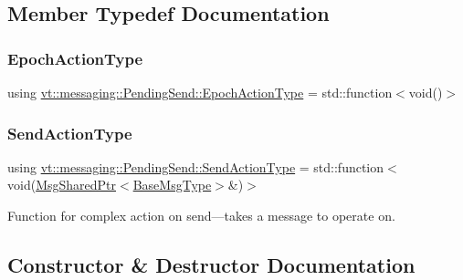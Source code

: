 \subsection{Member Typedef Documentation}
\mbox{\label{structvt_1_1messaging_1_1_pending_send_a25131dc5a5e003dc65187edc97c23d1c}} 
\subsubsection{\texorpdfstring{Epoch\+Action\+Type}{EpochActionType}}
{\footnotesize\ttfamily using \hyperlink{structvt_1_1messaging_1_1_pending_send_a25131dc5a5e003dc65187edc97c23d1c}{vt\+::messaging\+::\+Pending\+Send\+::\+Epoch\+Action\+Type} =  std\+::function$<$void()$>$}

\mbox{\label{structvt_1_1messaging_1_1_pending_send_aa13248a342d68230048cde8e0756851c}} 
\subsubsection{\texorpdfstring{Send\+Action\+Type}{SendActionType}}
{\footnotesize\ttfamily using \hyperlink{structvt_1_1messaging_1_1_pending_send_aa13248a342d68230048cde8e0756851c}{vt\+::messaging\+::\+Pending\+Send\+::\+Send\+Action\+Type} =  std\+::function$<$void(\hyperlink{structvt_1_1messaging_1_1_msg_shared_ptr}{Msg\+Shared\+Ptr}$<$\hyperlink{namespacevt_a44d0d4e144748f2b19a1cfd962f50338}{Base\+Msg\+Type}$>$\&)$>$}



Function for complex action on send---takes a message to operate on. 



\subsection{Constructor \& Destructor Documentation}
\mbox{\label{structvt_1_1messaging_1_1_pending_send_a7ea1d6401329b5f2a1f2f4ca8d4fed40}} 
